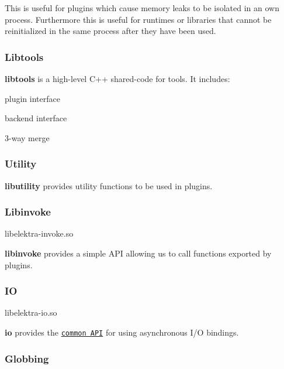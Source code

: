This is useful for plugins which cause memory leaks to be isolated in an own process. Furthermore this is useful for runtimes or libraries that cannot be reinitialized in the same process after they have been used.

\subsubsection*{Libtools}

{\bfseries libtools} is a high-\/level C++ shared-\/code for tools. It includes\+:


\begin{DoxyItemize}
\item plugin interface
\item backend interface
\item 3-\/way merge
\end{DoxyItemize}

\subsubsection*{Utility}

{\bfseries libutility} provides utility functions to be used in plugins.

\subsubsection*{Libinvoke}

\begin{DoxyVerb}libelektra-invoke.so
\end{DoxyVerb}


{\bfseries libinvoke} provides a simple A\+PI allowing us to call functions exported by plugins.

\subsubsection*{IO}

\begin{DoxyVerb}libelektra-io.so
\end{DoxyVerb}


{\bfseries io} provides the \href{https://doc.libelektra.org/api/current/html/group__kdbio.html}{\tt common A\+PI} for using asynchronous I/O bindings.

\subsubsection*{Globbing}

